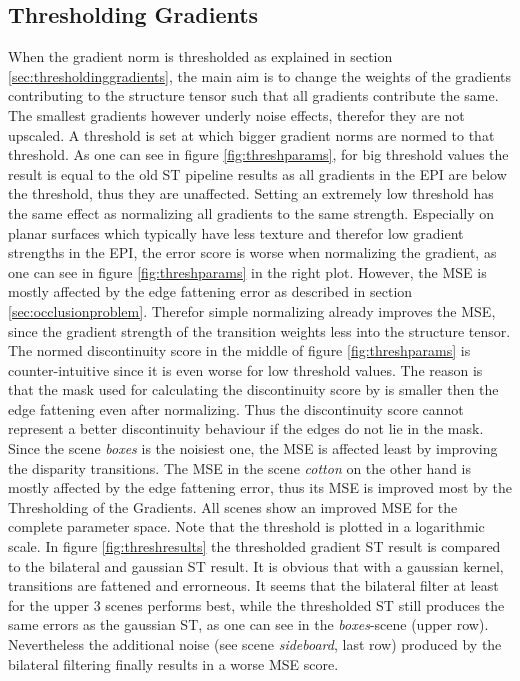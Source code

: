 \documentclass  [
  paper    = a4,
  BCOR     = 10mm,
  twoside,
  fontsize = 12pt,
  fleqn,
  toc      = bibnumbered,
  toc      = listofnumbered,
  numbers  = noendperiod,
  headings = normal,
  listof   = leveldown,
  version  = 3.03
]                                       {scrreprt}
\begin{document}
\subsection{Thresholding Gradients}
\label{sec:ev_thresh}
When the gradient norm is thresholded as explained in section \ref{sec:thresholdinggradients}, the main aim is to change the weights of the gradients contributing to the structure tensor such that all gradients contribute the same. The smallest gradients however underly noise effects, therefor they are not upscaled. A threshold is set at which bigger gradient norms are normed to that threshold. As one can see in figure \ref{fig:threshparams}, for big threshold values the result is equal to the old ST pipeline results as all gradients in the EPI are below the threshold, thus they are unaffected. Setting an extremely low threshold has the same effect as normalizing all gradients to the same strength. Especially on planar surfaces which typically have less texture and therefor low gradient strengths in the EPI, the error score is worse when normalizing the gradient, as one can see in figure \ref{fig:threshparams} in the right plot. However, the MSE is mostly affected by the edge fattening error as described in section \ref{sec:occlusionproblem}. Therefor simple normalizing already improves the MSE, since the gradient strength of the transition weights less into the structure tensor. The normed discontinuity score in the middle of figure \ref{fig:threshparams} is counter-intuitive since it is even worse for low threshold values. The reason is that the mask used for calculating the discontinuity score by \cite{honauer2016benchmark} is smaller then the edge fattening even after normalizing. Thus the discontinuity score cannot represent a better discontinuity behaviour if the edges do not lie in the mask. \\
Since the scene \textit{boxes} is the noisiest one, the MSE is affected least by improving the disparity transitions. The MSE in the scene \textit{cotton} on the other hand is mostly affected by the edge fattening error, thus its MSE is improved most by the Thresholding of the Gradients. All scenes show an improved MSE for the complete parameter space. Note that the threshold is plotted in a logarithmic scale. In figure \ref{fig:threshresults} the thresholded gradient ST result is compared to the bilateral and gaussian ST result. It is obvious that with a gaussian kernel, transitions are fattened and errorneous. It seems that the bilateral filter at least for the upper 3 scenes performs best, while the thresholded ST still produces the same errors as the gaussian ST, as one can see in the \textit{boxes}-scene (upper row). Nevertheless the additional noise (see scene \textit{sideboard}, last row) produced by the bilateral filtering finally results in a worse MSE score. 
\end{document}
